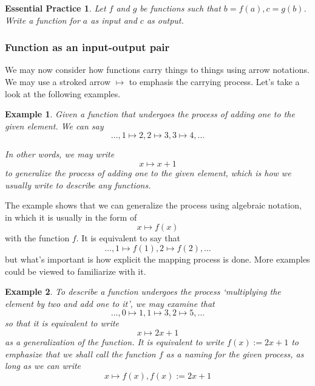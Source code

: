 \documentclass[12pt]{article}
\newtheorem*{example}{Example}
\newtheorem{exercise}{Essential Practice}[subsubsection]
\begin{document}
    \begin{exercise}
        Let $f$ and $g$ be functions such that $b=f(a), c=g(b)$. Write a function for $a$ as input and $c$ as output.
    \end{exercise}
        

    \subsubsection{Function as an input-output pair}

    We may now consider how functions carry things to things using arrow notations. We may use a stroked arrow $\mapsto$ to emphasis the carrying process. Let's take a look at the following examples.

    \begin{example}
        Given a function that undergoes the process of adding one to the given element. We can say $$\dots, 1\mapsto 2, 2\mapsto 3, 3\mapsto 4, \dots$$

        In other words, we may write $$x\mapsto x+1$$ to generalize the process of adding one to the given element, which is how we usually write to describe any functions.
    \end{example}

    The example shows that we can generalize the process using algebraic notation, in which it is usually in the form of $$x\mapsto f(x)$$ with the function $f$. It is equivalent to say that $$\dots, 1\mapsto f(1), 2\mapsto f(2), \dots$$ but what's important is how explicit the mapping process is done. More examples could be viewed to familiarize with it.

    \begin{example}
        To describe a function undergoes the process `multiplying the element by two and add one to it', we may examine that $$\dots, 0\mapsto 1, 1\mapsto 3, 2\mapsto 5,\dots$$ so that it is equivalent to write $$x\mapsto 2x+1$$ as a generalization of the function. It is equivalent to write $f(x):=2x+1$ to emphasize that we shall call the function $f$ as a naming for the given process, as long as we can write $$x\mapsto f(x), f(x):=2x+1$$
    \end{example}
\end{document}
